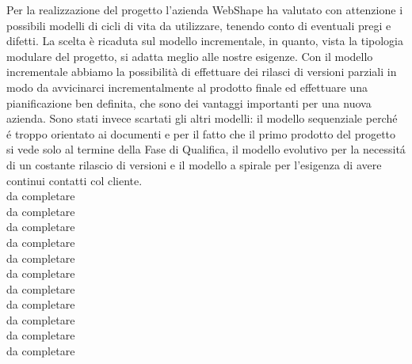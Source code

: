 Per la realizzazione del progetto l'azienda WebShape ha valutato con attenzione i possibili modelli di cicli di vita da utilizzare, tenendo conto di eventuali pregi e difetti. 
La scelta \`e ricaduta sul modello incrementale, in quanto, vista la tipologia modulare del progetto, si adatta meglio alle nostre esigenze. Con il modello incrementale abbiamo la possibilità di effettuare dei rilasci di versioni parziali in modo da avvicinarci incrementalmente al prodotto finale ed effettuare una pianificazione ben definita, che sono dei vantaggi importanti per una nuova azienda. Sono stati invece scartati gli altri modelli: il modello sequenziale perch\'e \'e troppo orientato ai documenti e per il fatto che il primo prodotto del progetto si vede solo al termine della Fase di Qualifica, il modello evolutivo per la necessit\'a di un costante rilascio di versioni e il modello a spirale per l'esigenza di avere continui contatti col cliente.\\
da completare\\
da completare\\
da completare\\
da completare\\
da completare\\
da completare\\
da completare\\
da completare\\
da completare\\
da completare\\
da completare\\


